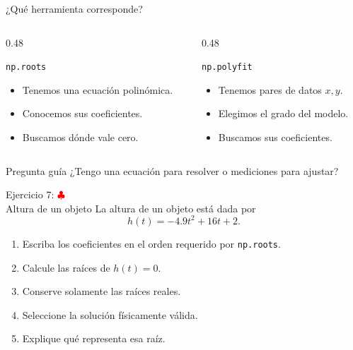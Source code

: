 \documentclass[10pt]{beamer}
\begin{document}
\begin{frame}{¿Qué herramienta corresponde?}
  \begin{columns}
    \begin{column}{0.48\textwidth}
      \begin{block}{\texttt{np.roots}}
        \begin{itemize}
          \item Tenemos una ecuación polinómica.
          \item Conocemos sus coeficientes.
          \item Buscamos dónde vale cero.
        \end{itemize}
      \end{block}
    \end{column}
    \begin{column}{0.48\textwidth}
      \begin{block}{\texttt{np.polyfit}}
        \begin{itemize}
          \item Tenemos pares de datos \(x,y\).
          \item Elegimos el grado del modelo.
          \item Buscamos sus coeficientes.
        \end{itemize}
      \end{block}
    \end{column}
  \end{columns}

  \begin{alertblock}{Pregunta guía}
    ¿Tengo una ecuación para resolver o mediciones para ajustar?
  \end{alertblock}
\end{frame}

\begin{frame}{Ejercicio 7: \hfill \textcolor{red}{$\clubsuit$} \\ Altura de un objeto}
  La altura de un objeto está dada por
  \[
    h(t)=-4.9t^2+16t+2.
  \]

  \begin{enumerate}
    \item Escriba los coeficientes en el orden requerido por \texttt{np.roots}.
    \item Calcule las raíces de \(h(t)=0\).
    \item Conserve solamente las raíces reales.
    \item Seleccione la solución físicamente válida.
    \item Explique qué representa esa raíz.
  \end{enumerate}
\end{frame}
\end{document}
